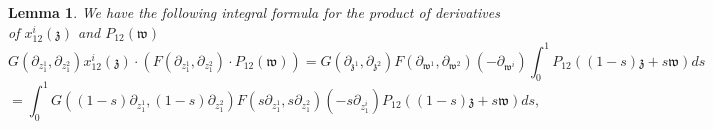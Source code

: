\documentclass[11pt]{amsart}
\newtheorem{lem}[thm]{Lemma}
\theoremstyle{definition}
\theoremstyle{remark}
\numberwithin{equation}{section}
\begin{document}
\begin{lem}\label{IntegralXP}
We have the following integral formula for the product of derivatives of $x^i_{12}(\mathfrak{z})$ and $P_{12}(\mathfrak{w})$
  $$
G(\partial_{z^1_{1}},\partial_{z^2_{1}})x^i_{12}(\mathfrak{z})\cdot\left( F(\partial_{z^1_{1}},\partial_{z^2_{1}})\cdot P_{12}(\mathfrak{w})\right)=G(\partial_{\mathfrak{z}^1},\partial_{\mathfrak{z}^2})F(\partial_{\mathfrak{w}^1},\partial_{\mathfrak{w}^2})(-\partial_{\mathfrak{w}^i})\int^1_0P_{12}\left((1-s)\mathfrak{z}+s\mathfrak{w}\right)ds
  $$
  $$
  =\int^1_0G\left((1-s)\partial_{z^1_1},(1-s)\partial_{z^2_1}\right)F\left(s\partial_{z^1_1},s\partial_{z^2_1}\right)(-s\partial_{z^i_1})P_{12}\left((1-s)\mathfrak{z}+s\mathfrak{w}\right)ds,
  $$
  \iffalse
$$
G(\partial_{z^1_{1}},\partial_{z^2_{1}})P_{12}(\mathfrak{z})\cdot\left( F(\partial_{z^1_{1}},\partial_{z^2_{1}})\cdot x^i_{12}(\mathfrak{w})\right)=G(\partial_{\mathfrak{z}^1},\partial_{\mathfrak{z}^2})F(\partial_{\mathfrak{w}^1},\partial_{\mathfrak{w}^2})(-\partial_{\mathfrak{z}^i})\int^1_0P_{12}\left((1-s)\mathfrak{z}+s\mathfrak{w}\right)ds
  $$
  $$
  =\int^1_0G\left((1-s)\partial_{z^1_1},(1-s)\partial_{z^2_1}\right)F\left(s\partial_{z^1_1},s\partial_{z^2_1}\right)(-(1-s)\partial_{z^i_1})P_{12}\left((1-s)\mathfrak{z}+s\mathfrak{w}\right)ds.
  $$
  \fi
\end{lem}
\end{document}
